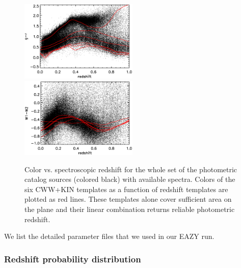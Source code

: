 \documentclass[apj,iop]{emulateapj}
\begin{document}
\begin{figure}[!ht]
	\includegraphics[width=0.5\textwidth]{figures/color_gr_z.eps}
	\includegraphics[width=0.5\textwidth]{figures/color_w1w2_z.eps}
	\caption{Color vs. spectroscopic redshift for the whole set of the photometric catalog sources (colored black) with available spectra. Colors of the six CWW+KIN templates as a function of redshift templates are plotted as red lines. These templates alone cover sufficient area on the plane and their linear combination returns reliable photometric redshift.}
	\label{fig:color_z}
\end{figure}

We list the detailed parameter files that we used in our EAZY run.

\subsubsection{Redshift probability distribution} \label{pdz}

\end{document}
